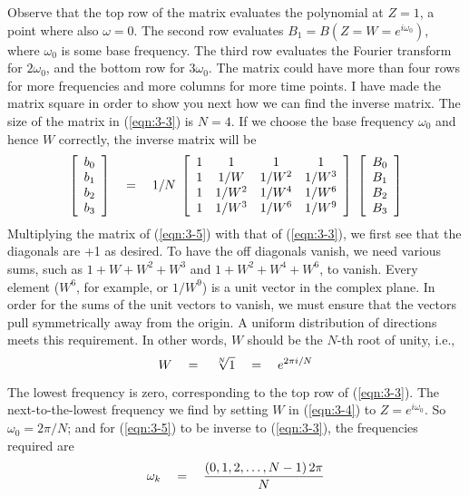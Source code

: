 Observe that the top row of the matrix evaluates the polynomial at $Z=1$,
a point where also
$\omega=0$.
The second row evaluates $B_1=B(Z=W=e^{i\omega_0})$,
where $\omega_0$ is some base frequency.
The third row evaluates the Fourier transform for $2\omega_0$,
and the bottom row for $3\omega_0$.
The matrix could have more than four rows for more frequencies
and more columns for more time points.
I have made the matrix square in order to show you next
how we can find the inverse matrix.
The size of the matrix in (\ref{eqn:3-3}) is $N=4$.
If we choose the base frequency $\omega_0$ and hence $W$ correctly,
the inverse matrix will be
\begin{equation}
  \left[ \begin{array}{c}
   b_0 \\
   b_1 \\
   b_2 \\
   b_3  \end{array} \right]
\quad =\quad   1/N \; 
\left[ \begin{array}{cccc}
   1 & 1 & 1 & 1 \\
   1 & 1/W & 1/W^2 & 1/W^3 \\
   1  & 1/W^2 & 1/W^4 & 1/W^6 \\
   1  & 1/W^3 & 1/W^6 & 1/W^9  \end{array} \right]  \;
  \left[ \begin{array}{c}
   B_0 \\
   B_1 \\
   B_2 \\
   B_3 \end{array} \right]   
\label{eqn:3-5}
\end{equation}
Multiplying the matrix of
(\ref{eqn:3-5}) with that of 
(\ref{eqn:3-3}),
we first see that the diagonals are +1 as desired.
To have the off diagonals vanish,
we need various sums,
such as $1+W  +W^2+W^3$
and     $1+W^2+W^4+W^6$, to vanish.
Every element ($W^6$, for example,
or $1/W^9$) is a unit vector in the complex plane.
In order for the sums of the unit vectors to vanish,
we must ensure that the vectors pull symmetrically away from the origin.
A uniform distribution of directions meets this requirement.
In other words, $W$ should be the $N$-th root of unity, i.e.,
\begin{equation}
W \quad =\quad
\sqrt[N]{1} \quad =\quad
e^{2\pi i/N} 
\label{eqn:3-4}
\end{equation}
\par
The lowest frequency is zero, corresponding to the top row of
(\ref{eqn:3-3}).
The next-to-the-lowest frequency we find by setting $W$ in
(\ref{eqn:3-4}) to $Z=e^{i\omega_0}$.
So $\omega_0=2\pi /N$; and
for (\ref{eqn:3-5}) to be inverse to (\ref{eqn:3-3}),
the frequencies required are
\begin{equation}
\omega_k \quad =\quad { (0, 1, 2, \ldots , N- 1) \, 2\pi \over N} 
\label{eqn:3-2}
\end{equation}



